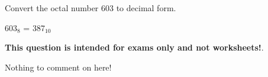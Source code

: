 

Convert the octal number 603 to decimal form.







603$_8$ = 387$_{10}$







{\bf This question is intended for exams only and not worksheets!}.

Nothing to comment on here!




